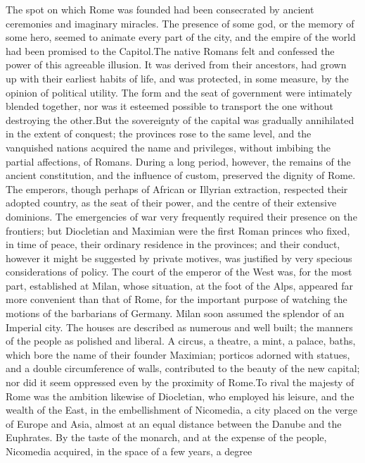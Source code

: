 The spot on which Rome was founded had been consecrated by
ancient ceremonies and imaginary miracles. The presence of some
god, or the memory of some hero, seemed to animate every part of
the city, and the empire of the world had been promised to the
Capitol.\footnotemark[88] The native Romans felt and confessed the power of
this agreeable illusion. It was derived from their ancestors, had
grown up with their earliest habits of life, and was protected,
in some measure, by the opinion of political utility. The form
and the seat of government were intimately blended together, nor
was it esteemed possible to transport the one without destroying
the other.\footnotemark[89] But the sovereignty of the capital was gradually
annihilated in the extent of conquest; the provinces rose to the
same level, and the vanquished nations acquired the name and
privileges, without imbibing the partial affections, of Romans.
During a long period, however, the remains of the ancient
constitution, and the influence of custom, preserved the dignity
of Rome. The emperors, though perhaps of African or Illyrian
extraction, respected their adopted country, as the seat of their
power, and the centre of their extensive dominions. The
emergencies of war very frequently required their presence on the
frontiers; but Diocletian and Maximian were the first Roman
princes who fixed, in time of peace, their ordinary residence in
the provinces; and their conduct, however it might be suggested
by private motives, was justified by very specious considerations
of policy. The court of the emperor of the West was, for the most
part, established at Milan, whose situation, at the foot of the
Alps, appeared far more convenient than that of Rome, for the
important purpose of watching the motions of the barbarians of
Germany. Milan soon assumed the splendor of an Imperial city. The
houses are described as numerous and well built; the manners of
the people as polished and liberal. A circus, a theatre, a mint,
a palace, baths, which bore the name of their founder Maximian;
porticos adorned with statues, and a double circumference of
walls, contributed to the beauty of the new capital; nor did it
seem oppressed even by the proximity of Rome.\footnotemark[90] To rival the
majesty of Rome was the ambition likewise of Diocletian, who
employed his leisure, and the wealth of the East, in the
embellishment of Nicomedia, a city placed on the verge of Europe
and Asia, almost at an equal distance between the Danube and the
Euphrates. By the taste of the monarch, and at the expense of the
people, Nicomedia acquired, in the space of a few years, a degree
